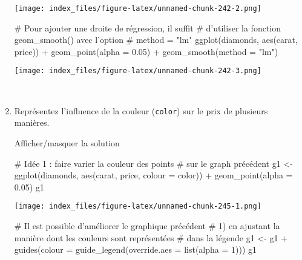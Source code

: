\documentclass[12pt,]{article}
\newenvironment{Shaded}{}{}
\newcommand{\KeywordTok}[1]{\textcolor[rgb]{0.00,0.00,1.00}{{#1}}}
\newcommand{\DataTypeTok}[1]{{#1}}
\newcommand{\DecValTok}[1]{{#1}}
\newcommand{\FloatTok}[1]{{#1}}
\newcommand{\StringTok}[1]{\textcolor[rgb]{0.00,0.50,0.50}{{#1}}}
\newcommand{\CommentTok}[1]{\textcolor[rgb]{0.00,0.50,0.00}{{#1}}}
\newcommand{\NormalTok}[1]{{#1}}
\begin{document}
\begin{enumerate}
  \texttt{[image: index\_files/figure-latex/unnamed-chunk-242-2.png]}

\begin{Shaded}
\begin{Highlighting}[]

\CommentTok{# Pour ajouter une droite de régression, il suffit }
\CommentTok{# d'utiliser la fonction geom_smooth() avec l'option}
\CommentTok{# method = "lm"}
\KeywordTok{ggplot}\NormalTok{(diamonds, }\KeywordTok{aes}\NormalTok{(carat, price)) +}\StringTok{ }\KeywordTok{geom_point}\NormalTok{(}\DataTypeTok{alpha =} \FloatTok{0.05}\NormalTok{) +}\StringTok{ }
\StringTok{  }\KeywordTok{geom_smooth}\NormalTok{(}\DataTypeTok{method =} \StringTok{"lm"}\NormalTok{)}
\end{Highlighting}
\end{Shaded}

  \texttt{[image: index\_files/figure-latex/unnamed-chunk-242-3.png]}

  ~
\item
  Représentez l'influence de la couleur (\texttt{color}) sur le prix de
  plusieurs manières.

  Afficher/masquer la solution

  \hypertarget{sol67}{}
\begin{Shaded}
\begin{Highlighting}[]
\CommentTok{# Idée 1 : faire varier la couleur des points }
\CommentTok{# sur le graph précédent}
\NormalTok{g1 <-}\StringTok{ }\KeywordTok{ggplot}\NormalTok{(diamonds, }\KeywordTok{aes}\NormalTok{(carat, price, }\DataTypeTok{colour =} \NormalTok{color)) +}\StringTok{ }\KeywordTok{geom_point}\NormalTok{(}\DataTypeTok{alpha =} \FloatTok{0.05}\NormalTok{)}
\NormalTok{g1}
\end{Highlighting}
\end{Shaded}

  \texttt{[image: index\_files/figure-latex/unnamed-chunk-245-1.png]}

\begin{Shaded}
\begin{Highlighting}[]

\CommentTok{# Il est possible d'améliorer le graphique précédent}
\CommentTok{# 1) en ajustant la manière dont les couleurs sont représentées }
\CommentTok{# dans la légende}
\NormalTok{g1 <-}\StringTok{ }\NormalTok{g1 +}\StringTok{ }\KeywordTok{guides}\NormalTok{(}\DataTypeTok{colour =} \KeywordTok{guide_legend}\NormalTok{(}\DataTypeTok{override.aes =} \KeywordTok{list}\NormalTok{(}\DataTypeTok{alpha =} \DecValTok{1}\NormalTok{)))}
\NormalTok{g1}
\end{Highlighting}
\end{Shaded}


\end{enumerate}
\end{document}
